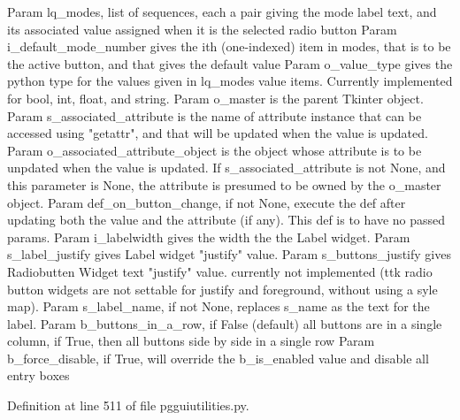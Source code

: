 \begin{DoxyVerb}Param lq_modes, list of sequences, each a pair
    giving the mode label text, and its associated value
    assigned when it is the selected radio button
Param i_default_mode_number gives the ith (one-indexed)
    item in modes, that is to be the active button,
    and that gives the default value
Param o_value_type gives the python type for the values
    given in lq_modes value items.  Currently implemented
    for bool, int, float, and string.
Param o_master is the parent Tkinter object.
Param s_associated_attribute is the name of 
    attribute instance that can be accessed
    using "getattr", and that will be
    updated when the value is updated.
Param o_associated_attribute_object is the object whose attribute
    is to be unpdated when the value is updated.  If
    s_associated_attribute is not None, and this parameter
    is None, the attribute is presumed to be
    owned by the o_master object.
Param def_on_button_change, if not None, execute the def
    after updating both the value and the attribute (if any).
    This def is to have no passed params.
Param i_labelwidth gives the width the the Label widget.
Param s_label_justify gives Label widget "justify" value.
Param s_buttons_justify gives Radiobutten Widget text "justify" value.
currently not implemented (ttk radio button widgets are not
settable for justify and foreground, without using a syle map).
Param s_label_name, if not None, replaces s_name as the text for the label.
Param b_buttons_in_a_row, if False (default) all buttons are in a single column, if True,
then all buttons side by side in a single row
Param b_force_disable, if True, will override the b_is_enabled value and disable all entry 
      boxes
\end{DoxyVerb}
 

Definition at line 511 of file pgguiutilities.\+py.



